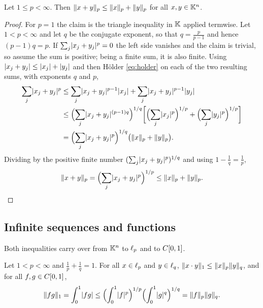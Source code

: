 \begin{theorem}\label{thm:minkowski}
Let $1 \le p < \infty$. Then $\lVert x+y\rVert_p \le \lVert x\rVert_p + \lVert y\rVert_p$ for
all $x, y \in \mathbb{K}^n$.
\end{theorem}

\begin{proof}
For $p = 1$ the claim is the triangle inequality in $\mathbb{K}$ applied termwise. Let
$1 < p < \infty$ and let $q$ be the conjugate exponent, so that
$q = \frac{p}{p-1}$ and hence $(p-1)q = p$. If
$\sum_j \lvert x_j + y_j\rvert^p = 0$ the left side vanishes and the claim is
trivial, so assume the sum is positive; being a finite sum, it is also finite.
Using $\lvert x_j+y_j\rvert \le \lvert x_j\rvert + \lvert y_j\rvert$ and then Hölder
\eqref{eq:holder} on each of the two resulting sums, with exponents $q$ and
$p$,
\[
  \begin{aligned}
    \sum_j \lvert x_j+y_j\rvert^p
    &\le \sum_j \lvert x_j+y_j\rvert^{p-1}\lvert x_j\rvert
       + \sum_j \lvert x_j+y_j\rvert^{p-1}\lvert y_j\rvert \\
    &\le \Bigl(\sum_j \lvert x_j+y_j\rvert^{(p-1)q}\Bigr)^{1/q}
         \biggl[\Bigl(\sum_j \lvert x_j\rvert^p\Bigr)^{1/p}
              + \Bigl(\sum_j \lvert y_j\rvert^p\Bigr)^{1/p}\biggr] \\
    &= \Bigl(\sum_j \lvert x_j+y_j\rvert^{p}\Bigr)^{1/q}
       \bigl(\lVert x\rVert_p + \lVert y\rVert_p\bigr).
  \end{aligned}
\]
Dividing by the positive finite number
$(\sum_j \lvert x_j+y_j\rvert^p)^{1/q}$ and using $1 - \frac{1}{q} = \frac{1}{p}$,
\[
  \lVert x+y\rVert_p = \Bigl(\sum_j \lvert x_j+y_j\rvert^p\Bigr)^{1/p}
  \le \lVert x\rVert_p + \lVert y\rVert_p . \qedhere
\]
\end{proof}

\subsection{Infinite sequences and functions}

Both inequalities carry over from $\mathbb{K}^n$ to $\ell_{p}$ and to $C[0,1]$.

\begin{theorem}\label{thm:holder-inf}
Let $1 < p < \infty$ and $\frac{1}{p} + \frac{1}{q} = 1$. For all
$x \in \ell_{p}$ and $y \in \ell_{q}$,
$\lVert x \cdot y\rVert_1 \le \lVert x\rVert_p \lVert y\rVert_q$, and for all
$f, g \in C[0,1]$,
\[
  \lVert fg\rVert_1 = \int_0^1 \lvert fg\rvert
  \le \Bigl(\int_0^1 \lvert f\rvert^p\Bigr)^{1/p}
      \Bigl(\int_0^1 \lvert g\rvert^q\Bigr)^{1/q}
  = \lVert f\rVert_p \lVert g\rVert_q .
\]
\end{theorem}

